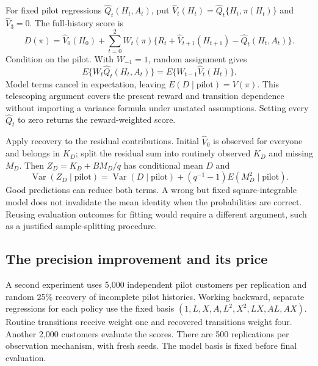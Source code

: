 For fixed pilot regressions $\widehat Q_t(H_t,A_t)$, put
$\widehat V_t(H_t)=\widehat Q_t\{H_t,\pi(H_t)\}$ and
$\widehat V_3=0$. The full-history score is
\begin{equation}
D(\pi)=\widehat V_0(H_0)+
 \sum_{t=0}^{2}W_t(\pi)
 \{R_t+\widehat V_{t+1}(H_{t+1})-\widehat Q_t(H_t,A_t)\}.
\label{closure30:sequential-score}
\end{equation}
Condition on the pilot. With $W_{-1}=1$, random assignment gives
\[
E\{W_t\widehat Q_t(H_t,A_t)\}
  =E\{W_{t-1}\widehat V_t(H_t)\}.
\]
Model terms cancel in expectation, leaving
$E(D\mid\text{pilot})=V(\pi)$. This telescoping argument covers the present
reward and transition dependence without importing a variance formula under
unstated assumptions. Setting every $\widehat Q_t$ to zero returns the
reward-weighted score.

Apply recovery to the residual contributions. Initial $\widehat V_0$ is
observed for everyone and belongs in $K_D$; split the residual sum into
routinely observed $K_D$ and missing $M_D$. Then $Z_D=K_D+B M_D/q$ has
conditional mean $D$ and
\[
\operatorname{Var}(Z_D\mid\text{pilot})
=\operatorname{Var}(D\mid\text{pilot})
 +(q^{-1}-1)E(M_D^2\mid\text{pilot}).
\]
Good predictions can reduce both terms. A wrong but fixed square-integrable
model does not invalidate the mean identity when the probabilities are
correct. Reusing evaluation outcomes for fitting would require a different
argument, such as a justified sample-splitting procedure.

\subsection{The precision improvement and its price}
A second experiment uses 5,000 independent pilot customers per
replication and random 25\% recovery of incomplete pilot histories.
Working backward, separate regressions for each policy use the fixed basis
$(1,L,X,A,L^2,X^2,LX,AL,AX)$. Routine transitions receive weight one and
recovered transitions weight four. Another 2,000 customers evaluate the
scores. There are 500 replications per observation mechanism, with fresh
seeds. The model basis is fixed before final evaluation.

